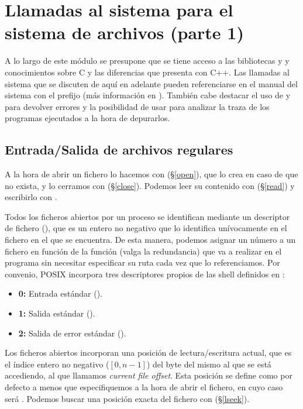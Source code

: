 \section{Llamadas al sistema para el sistema de archivos (parte 1)}

A lo largo de este módulo se presupone que se tiene acceso a las bibliotecas  y  y conocimientos sobre C y las diferencias que presenta con C++.
Las llamadas al sistema que se discuten de aquí en adelante pueden referenciarse en el manual del sistema con el prefijo  (más información en ).
También cabe destacar el uso de  y  para devolver errores y la posibilidad de usar  para analizar la traza de los programas ejecutados a la hora de depurarlos.

\subsection{Entrada/Salida de archivos regulares}

A la hora de abrir un fichero lo hacemos con  (\S\ref{open}), que lo crea en caso de que no exista, y lo cerramos con  (\S\ref{close}).
Podemos leer su contenido con  (\S\ref{read}) y escribirlo con .

Todos los ficheros abiertos por un proceso se identifican mediante un descriptor de fichero (), que es un entero no negativo que lo identifica unívocamente en el fichero en el que se encuentra.
De esta manera, podemos asignar un número a un fichero en función de la función (valga la redundancia) que va a realizar en el programa sin necesitar especificar su ruta cada vez que lo referenciamos.
Por convenio, POSIX incorpora tres descriptores propios de las shell definidos en :

\begin{itemize}
	\item\textbf{0:} Entrada estándar ().
	\item\textbf{1:} Salida estándar ().
	\item\textbf{2:} Salida de error estándar ().
\end{itemize}

Los ficheros abiertos incorporan una posición de lectura/escritura actual, que es el índice entero no negativo ($[0,n-1]$) del byte del mismo al que se está accediendo, al que llamamos \emph{current file offset}.
Esta posición se define como  por defecto a menos que especifiquemos  a la hora de abrir el fichero, en cuyo caso será .
Podemos buscar una posición exacta del fichero con  (\S\ref{lseek}).

